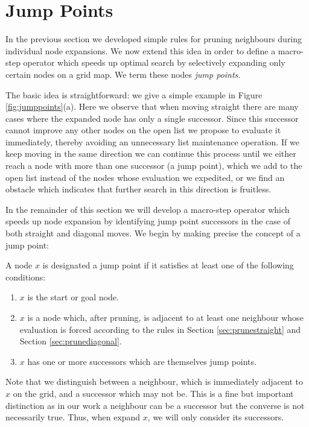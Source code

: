 \section{Jump Points}
In the previous section we developed simple rules for pruning neighbours during 
individual node expansions. We now extend this idea in order to define a 
macro-step operator which speeds up optimal search by selectively expanding
only certain nodes on a grid map. We term these nodes \emph{jump points}.
\par
The basic idea is straightforward: we give a simple example in Figure 
\ref{fig:jumppoints}(a).
Here we observe that when moving straight there are many cases where
the expanded node has only a single successor.
Since this successor cannot improve any other nodes on the open list we 
propose to evaluate it immediately, thereby avoiding an unnecessary list
maintenance operation. 
If we keep moving in the same direction we can continue this process until we 
either reach a node with more than one successor (a jump point), which we add to the open list instead of the nodes whose evaluation we expedited, or we find an 
obstacle which indicates that further search in this direction is fruitless.
\par
In the remainder of this section we will develop a macro-step operator which 
speeds up node expansion by identifying jump point successors in the case of
both straight and diagonal moves. We begin by making precise the concept of a
jump point:

\begin{definition}
\label{def:jump}
A node $x$ is designated a jump point if it satisfies at least one of the following
conditions:
\begin{enumerate}
\item{$x$ is the start or goal node.}
\item{$x$ is a node which, after pruning, is adjacent to at least one neighbour
whose evaluation is forced according to the rules in Section
\ref{sec:prunestraight} and Section \ref{sec:prunediagonal}.}
\item{$x$ has one or more successors which are themselves jump points.}
\end{enumerate}
\end{definition}

Note that we distinguish between a neighbour, which is immediately adjacent to
$x$ on the grid, and a successor which may not be. 
This is a fine but important distinction as in our work a neighbour can be a 
successor but the converse is not necessarily true.
Thus, when expand $x$, we will only consider its successors.


